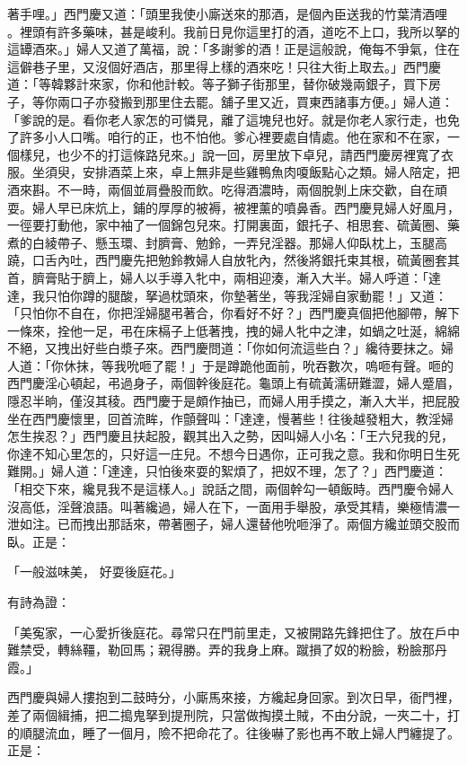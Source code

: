 \begin{showcontents}{}
著手哩。」西門慶又道：「頭里我使小廝送來的那酒，是個內臣送我的竹葉清酒哩 。裡頭有許多藥味，甚是峻利。我前日見你這里打的酒，道吃不上口，我所以拏的這罈酒來。」婦人又道了萬福，說：「多謝爹的酒！正是這般說，俺每不爭氣，住在這僻巷子里，又沒個好酒店，那里得上樣的酒來吃！只往大街上取去。」西門慶道：「等韓夥計來家，你和他計較。等子獅子街那里，替你破幾兩銀子，買下房子，等你兩口子亦發搬到那里住去罷。舖子里又近，買東西諸事方便。」婦人道：「爹說的是。看你老人家怎的可憐見，離了這塊兒也好。就是你老人家行走，也免了許多小人口嘴。咱行的正，也不怕他。爹心裡要處自情處。他在家和不在家，一個樣兒，也少不的打這條路兒來。」說一回，房里放下卓兒，請西門慶房裡寬了衣服。坐須臾，安排酒菜上來，卓上無非是些雞鴨魚肉嗄飯點心之類。婦人陪定，把酒來斟。不一時，兩個並肩疊股而飲。吃得酒濃時，兩個脫剝上床交歡，自在頑耍。婦人早已床炕上，鋪的厚厚的被褥，被裡薰的噴鼻香。西門慶見婦人好風月，一徑要打動他，家中袖了一個錦包兒來。打開裏面，銀托子、相思套、硫黃圈、藥煮的白綾帶子、懸玉環、封臍膏、勉鈴，一弄兒淫器。那婦人仰臥枕上，玉腿高蹺，口舌內吐，西門慶先把勉鈴教婦人自放牝內，然後將銀托束其根，硫黃圈套其首，臍膏貼于臍上，婦人以手導入牝中，兩相迎湊，漸入大半。婦人呼道：「達達，我只怕你蹲的腿酸，拏過枕頭來，你墊著坐，等我淫婦自家動罷！」又道：「只怕你不自在，你把淫婦腿弔著合，你看好不好？」西門慶真個把他腳帶，解下一條來，拴他一足，弔在床槅子上低著拽，拽的婦人牝中之津，如蝸之吐涎，綿綿不絕，又拽出好些白漿子來。西門慶問道：「你如何流這些白？」纔待要抹之。婦人道：「你休抹，等我吮咂了罷！」于是蹲跪他面前，吮吞數次，嗚咂有聲。咂的西門慶淫心頓起，弔過身子，兩個幹後庭花。龜頭上有硫黃濡研難澀，婦人蹙眉，隱忍半晌，僅沒其稜。西門慶于是頗作抽已，而婦人用手摸之，漸入大半，把屁股坐在西門慶懷里，回首流眸，作顫聲叫：「達達，慢著些！往後越發粗大，教淫婦怎生挨忍？」西門慶且扶起股，觀其出入之勢，因叫婦人小名：「王六兒我的兒，你達不知心里怎的，只好這一庄兒。不想今日遇你，正可我之意。我和你明日生死難開。」婦人道：「達達，只怕後來耍的絮煩了，把奴不理，怎了？」西門慶道：「相交下來，纔見我不是這樣人。」說話之間，兩個幹勾一頓飯時。西門慶令婦人沒高低，淫聲浪語。叫著纔過，婦人在下，一面用手舉股，承受其精，樂極情濃一泄如注。已而拽出那話來，帶著圈子，婦人還替他吮咂淨了。兩個方纔並頭交股而臥。正是：

「一般滋味美，  好耍後庭花。」

有詩為證：

「美寃家，一心愛折後庭花。尋常只在門前里走，又被開路先鋒把住了。放在戶中難禁受，轉絲韁，勒回馬；親得勝。弄的我身上麻。蹴損了奴的粉臉，粉臉那丹霞。」

西門慶與婦人摟抱到二鼓時分，小廝馬來接，方纔起身回家。到次日早，衙門裡，差了兩個緝捕，把二搗鬼拏到提刑院，只當做掏摸土賊，不由分說，一夾二十，打的順腿流血，睡了一個月，險不把命花了。往後嚇了影也再不敢上婦人門纏提了。正是：


\end{showcontents}
